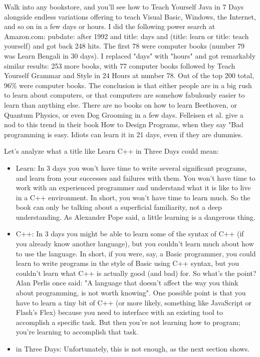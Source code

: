 \documentclass[12pt,a4paper,final,twoside,onecolumn,titlepage]{book}
\begin{document}
Walk into any bookstore, and you'll see how to Teach Yourself Java in 7 Days alongside endless variations offering to teach Visual Basic, Windows, the Internet, and so on in a few days or hours. I did the following power search at Amazon.com: pubdate: after 1992 and title: days and (title: learn or title: teach yourself)
and got back 248 hits. The first 78 were computer books (number 79 was Learn Bengali in 30 days). I replaced "days" with "hours" and got remarkably similar results: 253 more books, with 77 computer books followed by Teach Yourself Grammar and Style in 24 Hours at number 78. Out of the top 200 total, 96\% were computer books.
The conclusion is that either people are in a big rush to learn about computers, or that computers are somehow fabulously easier to learn than anything else. There are no books on how to learn Beethoven, or Quantum Physics, or even Dog Grooming in a few days. Felleisen et al. give a nod to this trend in their book How to Design Programs, when they say "Bad programming is easy. Idiots can learn it in 21 days, even if they are dummies.

Let's analyze what a title like Learn C++ in Three Days could mean:
\begin{itemize}
\item Learn: In 3 days you won't have time to write several significant programs, and learn from your successes and failures with them. You won't have time to work with an experienced programmer and understand what it is like to live in a C++ environment. In short, you won't have time to learn much. So the book can only be talking about a superficial familiarity, not a deep understanding. As Alexander Pope said, a little learning is a dangerous thing.
\item C++: In 3 days you might be able to learn some of the syntax of C++ (if you already know another language), but you couldn't learn much about how to use the language. In short, if you were, say, a Basic programmer, you could learn to write programs in the style of Basic using C++ syntax, but you couldn't learn what C++ is actually good (and bad) for. So what's the point? Alan Perlis once said: "A language that doesn't affect the way you think about programming, is not worth knowing". One possible point is that you have to learn a tiny bit of C++ (or more likely, something like JavaScript or Flash's Flex) because you need to interface with an existing tool to accomplish a specific task. But then you're not learning how to program; you're learning to accomplish that task.
\item in Three Days: Unfortunately, this is not enough, as the next section shows.
\end{itemize}
\end{document}
